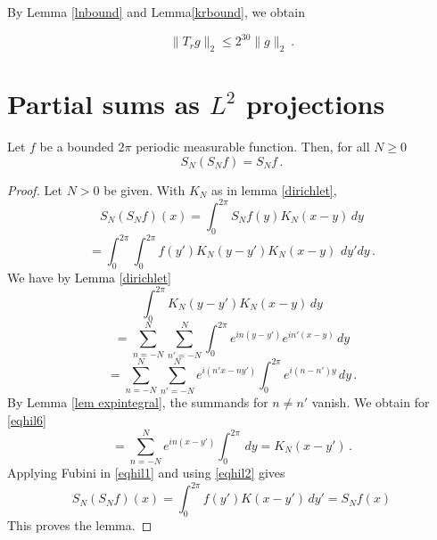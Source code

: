 By Lemma \ref{lnbound} and Lemma\ref{krbound}, we obtain

\begin{equation}
    \|T_rg\|_2\le 2^{30}\|g\|_2\ .
\end{equation}





\section{Partial sums as $L^2$ projections}
\label{10projection}









\begin{lemma}\label{lem projection}
    Let $f$ be a bounded $2\pi$ periodic measurable function. Then, for all $N\ge 0$
    \begin{equation}\label{projection}
    S_N(S_N f)=S_Nf\, .
    \end{equation}
    \end{lemma}
\begin{proof}
Let $N>0$ be given. With $K_N$ as in lemma \ref{dirichlet},
\begin{equation*}
S_N (S_Nf) (x)=
\int_0^{2\pi} S_Nf(y)K_N(x-y)\, dy
\end{equation*}
\begin{equation}\label{eqhil1}
=
\int_0^{2\pi} \int_0^{2\pi} f(y')K_N(y-y') K_N(x-y)\, \, dy' dy\, .
\end{equation}
We have by Lemma \ref{dirichlet}
\begin{equation*}
\int_0^{2\pi} K_N(y-y') K_N(x-y)\,  dy
\end{equation*}
\begin{equation*}
=\sum_{n=-N}^N\sum_{n'=-N}^N
\int_0^{2\pi} e^{in(y-y')}e^{in'(x-y)}\,  dy
\end{equation*}
\begin{equation}\label{eqhil6}
=\sum_{n=-N}^N\sum_{n'=-N}^N
e^{i(n'x-ny')}\int_0^{2\pi} e^{i(n-n')y}\,  dy\, .
\end{equation}
By Lemma \ref{lem expintegral}, the summands for $n\neq n'$ vanish.
We obtain for \eqref{eqhil6}
\begin{equation}\label{eqhil2}
=\sum_{n=-N}^N
e^{in(x-y')}\int_0^{2\pi} \,  dy=K_N(x-y')\, .
\end{equation}
Applying Fubini in  \eqref{eqhil1} and using
\eqref{eqhil2} gives
\begin{equation}
S_N(S_Nf)(x)=
\int_0^{2\pi}  f(y')K(x-y')  \, dy'=S_N f(x)
\end{equation}
This proves the lemma.
\end{proof}
